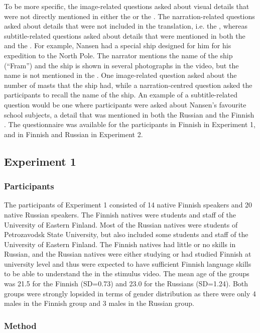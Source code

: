 \documentclass[output=paper]{langsci/langscibook}
\begin{document}
To be more specific, the image-related questions asked about visual details that were not directly mentioned in either the  or the . The narration-related questions asked about details that were not included in the translation, i.e. the , whereas subtitle-related questions asked about details that were mentioned in both the  and the . For example, Nansen had a special ship designed for him for his expedition to the North Pole. The narrator mentions the name of the ship (``Fram'') and the ship is shown in several photographs in the video, but the name is not mentioned in the . One image-related question asked about the number of masts that the ship had, while a narration-centred question asked the participants to recall the name of the ship. An example of a subtitle-related question would be one where participants were asked about Nansen's favourite school subjects, a detail that was mentioned in both the Russian  and the Finnish . The questionnaire was available for the participants in Finnish in Experiment 1, and in Finnish and Russian in Experiment 2.

\subsection{Experiment 1}

\subsubsection{Participants}

The participants of Experiment 1 consisted of 14 native Finnish speakers and 20 native Russian speakers. The Finnish natives were students and staff of the University of Eastern Finland. Most of the Russian natives were students of Petrozavodsk State University, but also included some students and staff of the University of Eastern Finland. The Finnish natives had little or no skills in Russian, and the Russian natives were either studying or had studied Finnish at university level and thus were expected to have sufficient Finnish language skills to be able to understand the  in the stimulus video. The mean age of the groups was 21.5 for the Finnish (SD=0.73) and 23.0 for the Russians (SD=1.24). Both groups were strongly lopsided in terms of gender distribution as there were only 4 males in the Finnish group and 3 males in the Russian group.

\subsubsection{Method}
\end{document}
